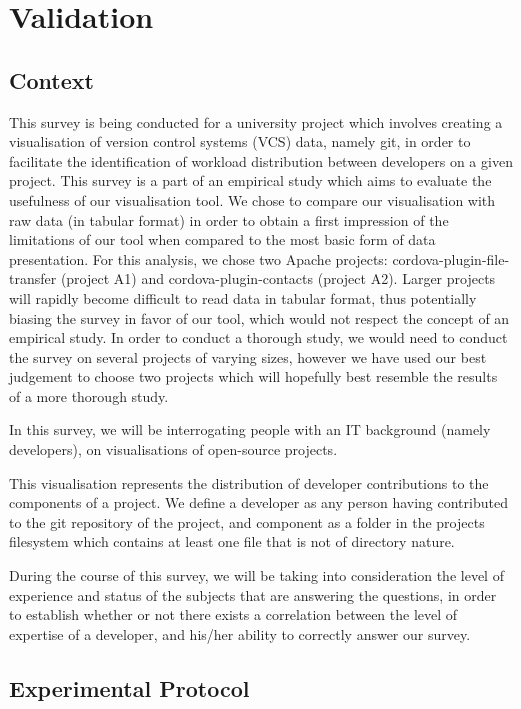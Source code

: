 \section{Validation}

\subsection{Context}

This survey is being conducted for a university project which involves creating a visualisation of version control systems (VCS) data, namely git, in order to facilitate the identification of workload distribution between developers on a given project.
This survey is a part of an empirical study which aims to evaluate the usefulness of our visualisation tool.
We chose to compare our visualisation with raw data (in tabular format) in order to obtain a first impression of the limitations of our tool when compared to the most basic form of data presentation.
For this analysis, we chose two Apache projects: cordova-plugin-file-transfer (project A1) and cordova-plugin-contacts (project A2). Larger projects will rapidly become difficult to read data in tabular format, thus potentially biasing the survey in favor of our tool, which would not respect the concept of an empirical study. In order to conduct a thorough study, we would need to conduct the survey on several projects of varying sizes, however we have used our best judgement to choose two projects which will hopefully best resemble the results of a more thorough study.

In this survey, we will be interrogating people with an IT background (namely developers), on visualisations of open-source projects.

This visualisation represents the distribution of developer contributions to the components of a project. We define a developer as any person having contributed to the git repository of the project, and component as a folder in the projects filesystem which contains at least one file that is not of directory nature.

During the course of this survey, we will be taking into consideration the level of experience and status of the subjects that are answering the questions, in order to establish whether or not there exists a correlation between the level of expertise of a developer, and his/her ability to correctly answer our survey.


\subsection{Experimental Protocol}

